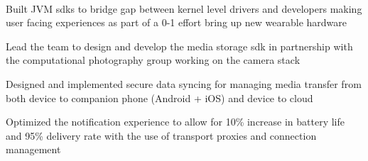 \documentclass[letterpaper]{deedy-resume-openfont} %
\begin{document}
\begin{minipage}[t]{0.66\textwidth}
\\

\begin{tightitemize}
\item Built JVM sdks to bridge gap between kernel level drivers and developers making user facing experiences as part of a 0-1 effort bring up new wearable hardware
\item Lead the team to design and develop the media storage sdk in partnership with the computational photography group working on the camera stack
\item Designed and implemented secure data syncing for managing media transfer from both device to companion phone (Android + iOS) and device to cloud
\item Optimized the notification experience to allow for 10\% increase in battery life and 95\% delivery  rate with the use of transport proxies and connection management
\end{tightitemize}





\end{minipage}
\end{document}
